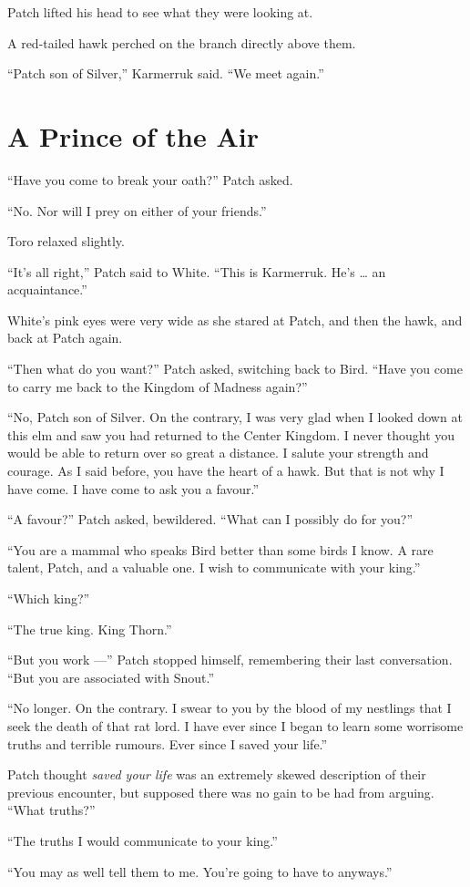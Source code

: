 \documentclass[ebook,oneside,openany,17pt]{memoir}
\renewcommand{\thechapter}{\Roman{chapter}}
\newcounter{sections}
\newcommand{\sections}[1]{%
  \section*{#1}
  \addtocounter{sections}{1}%
  \pdfbookmark[1]{#1}{section.\thechapter.\thesections}}
\begin{document}
Patch lifted his head to see what they were looking at.

A red-tailed hawk perched on the branch directly above them.

“Patch son of Silver,” Karmerruk said. “We meet again.”


\sections{A Prince of the Air}

“Have you come to break your oath?” Patch asked.

“No. Nor will I prey on either of your friends.”

Toro relaxed slightly.

“It’s all right,” Patch said to White. “This is Karmerruk. He’s … an
acquaintance.”

White’s pink eyes were very wide as she stared at Patch, and then the
hawk, and back at Patch again.

“Then what do you want?” Patch asked, switching back to Bird. “Have
you come to carry me back to the Kingdom of Madness again?”

“No, Patch son of Silver. On the contrary, I was very glad when I
looked down at this elm and saw you had returned to the Center
Kingdom. I never thought you would be able to return over so great a
distance. I salute your strength and courage. As I said before, you
have the heart of a hawk. But that is not why I have come. I have come
to ask you a favour.”

“A favour?” Patch asked, bewildered. “What can I possibly do for you?”

“You are a mammal who speaks Bird better than some birds I know. A
rare talent, Patch, and a valuable one. I wish to communicate with
your king.”

“Which king?”

“The true king. King Thorn.”

“But you work —” Patch stopped himself, remembering their last
conversation. “But you are associated with Snout.”

“No longer. On the contrary. I swear to you by the blood of my
nestlings that I seek the death of that rat lord. I have ever since I
began to learn some worrisome truths and terrible rumours. Ever since
I saved your life.”

Patch thought \emph{saved your life} was an extremely skewed
description of their previous encounter, but supposed there was no
gain to be had from arguing. “What truths?”

“The truths I would communicate to your king.”

“You may as well tell them to me. You’re going to have to anyways.”
\end{document}
